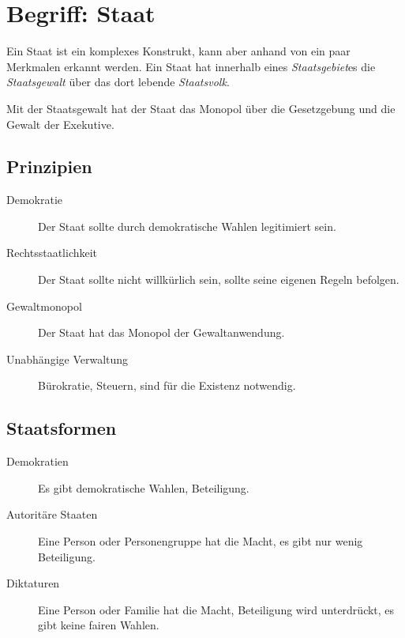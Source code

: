 \documentclass{article}
\begin{document}
\section{Begriff: Staat} 
Ein Staat ist ein komplexes Konstrukt, kann aber anhand von ein paar Merkmalen erkannt werden. Ein Staat hat innerhalb eines \emph{Staatsgebiet}es die \emph{Staatsgewalt} über das dort lebende \emph{Staatsvolk}.

Mit der Staatsgewalt hat der Staat das Monopol über die Gesetzgebung und die Gewalt der Exekutive.

\subsection{Prinzipien}
\begin{description}
 \item[Demokratie] Der Staat sollte durch demokratische Wahlen legitimiert sein.
 \item[Rechtsstaatlichkeit] Der Staat sollte nicht willkürlich sein, sollte seine eigenen Regeln befolgen.
 \item[Gewaltmonopol] Der Staat hat das Monopol der Gewaltanwendung.
 \item[Unabhängige Verwaltung] Bürokratie, \zb Steuern, sind für die Existenz notwendig.
\end{description}

\subsection{Staatsformen}
\begin{description}
 \item[Demokratien] Es gibt demokratische Wahlen, Beteiligung.
 \item[Autoritäre Staaten] Eine Person oder Personengruppe hat die Macht, es gibt nur wenig Beteiligung.
 \item[Diktaturen] Eine Person oder Familie hat die Macht, Beteiligung wird unterdrückt, es gibt keine fairen Wahlen.
\end{description}
\end{document}
